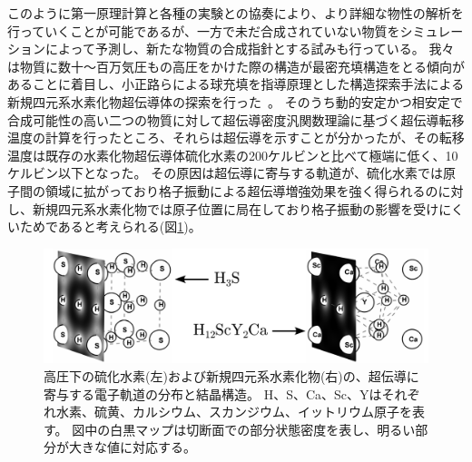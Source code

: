 このように第一原理計算と各種の実験との協奏により、より詳細な物性の解析を行っていくことが可能であるが、一方で未だ合成されていない物質をシミュレーションによって予測し、新たな物質の合成指針とする試みも行っている。
我々は物質に数十～百万気圧もの高圧をかけた際の構造が最密充填構造をとる傾向があることに着目し、小正路らによる球充填を指導原理とした構造探索手法による新規四元系水素化物超伝導体の探索を行った~\cite{koshoji.prm.6.114802}。
そのうち動的安定かつ相安定で合成可能性の高い二つの物質に対して超伝導密度汎関数理論に基づく超伝導転移温度の計算を行ったところ、それらは超伝導を示すことが分かったが、その転移温度は既存の水素化物超伝導体硫化水素の200ケルビンと比べて極端に低く、10ケルビン以下となった。
その原因は超伝導に寄与する軌道が、硫化水素では原子間の領域に拡がっており格子振動による超伝導増強効果を強く得られるのに対し、新規四元系水素化物では原子位置に局在しており格子振動の影響を受けにくいためであると考えられる(図\ref{kawamura_fig_charge_ef})。
%
\begin{figure}[!tb]
    \begin{center}
      \includegraphics[width=12cm]{Kawamura/charge_ef.pdf}
      \caption{\label{kawamura_fig_charge_ef}
        高圧下の硫化水素(左)および新規四元系水素化物(右)の、超伝導に寄与する電子軌道の分布と結晶構造。
        H、S、Ca、Sc、Yはそれぞれ水素、硫黄、カルシウム、スカンジウム、イットリウム原子を表す。
        図中の白黒マップは切断面での部分状態密度を表し、明るい部分が大きな値に対応する。}
    \end{center}
  \end{figure}
